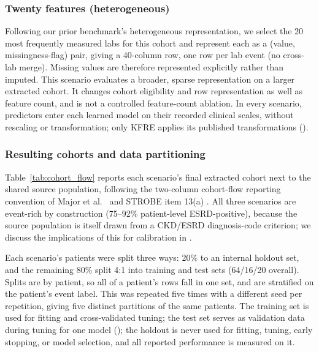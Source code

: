 \documentclass[10pt,letterpaper]{article}
\begin{document}
\subsubsection*{Twenty features (heterogeneous)}
Following our prior benchmark's heterogeneous representation, we select the 20 most frequently measured labs for this cohort and represent each as a (value, missingness-flag) pair, giving a 40-column row, one row per lab event (no cross-lab merge). Missing values are therefore represented explicitly rather than imputed. This scenario evaluates a broader, sparse representation on a larger extracted cohort. It changes cohort eligibility and row representation as well as feature count, and is not a controlled feature-count ablation. In every scenario, predictors enter each learned model on their recorded clinical scales, without rescaling or transformation; only KFRE applies its published transformations ().

\subsubsection*{Resulting cohorts and data partitioning}
Table~\ref{tab:cohort_flow} reports each scenario's final extracted cohort next to the shared source population, following the two-column cohort-flow reporting convention of Major et al.\ \cite{major2019kfre_external_validation} and STROBE item 13(a) \cite{vonelm2007strobe}. All three scenarios are event-rich by construction (75--92\% patient-level ESRD-positive), because the source population is itself drawn from a CKD/ESRD diagnosis-code criterion; we discuss the implications of this for calibration in .

Each scenario's patients were split three ways: 20\% to an internal holdout set, and the remaining 80\% split 4:1 into training and test sets (64/16/20 overall). Splits are by patient, so all of a patient's rows fall in one set, and are stratified on the patient's event label. This was repeated five times with a different seed per repetition, giving five distinct partitions of the same patients. The training set is used for fitting and cross-validated tuning; the test set serves as validation data during tuning for one model (); the holdout is never used for fitting, tuning, early stopping, or model selection, and all reported performance is measured on it.
\end{document}
